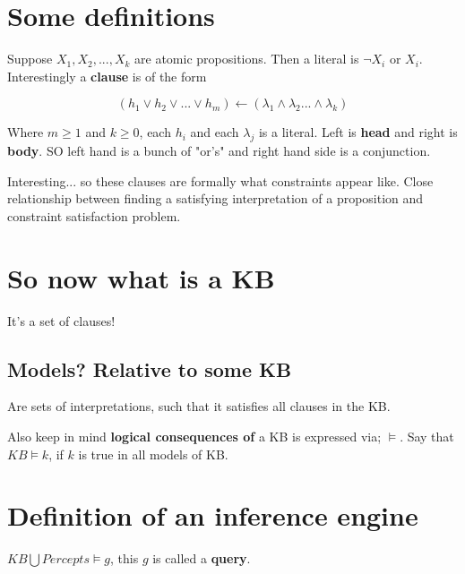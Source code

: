 \documentclass{article}
\begin{document}
\section{Some definitions}
Suppose $X_1, X_2, ..., X_k$ are atomic propositions. Then a literal is $\neg X_i$ or $X_i$. Interestingly a \textbf{clause} is of the form

\begin{equation}
	(h_1 \lor h_2 \lor ... \lor h_m) \leftarrow (\lambda_1 \land \lambda_2 ... \land \lambda_k)
\end{equation}

Where $m \geq 1$ and $k \geq 0$, each $h_i$ and each $\lambda_j$ is a literal. Left is \textbf{head} and right is \textbf{body}. SO left hand is a bunch of "or's" and right hand side is a conjunction.

Interesting... so these clauses are formally what constraints appear like. Close relationship between finding a satisfying interpretation of a proposition and constraint satisfaction problem.

\section{So now what is a KB}
It's a set of clauses!

\subsection{Models? Relative to some KB}
Are sets of interpretations, such that it satisfies all clauses in the KB.

Also keep in mind \textbf{logical consequences of} a KB is expressed via; $\vDash$. Say that $KB \vDash k$, if $k$ is true in all models of KB.

\section{Definition of an inference engine}
$KB \bigcup Percepts \vDash g$, this $g$ is called a \textbf{query}.
\end{document}

